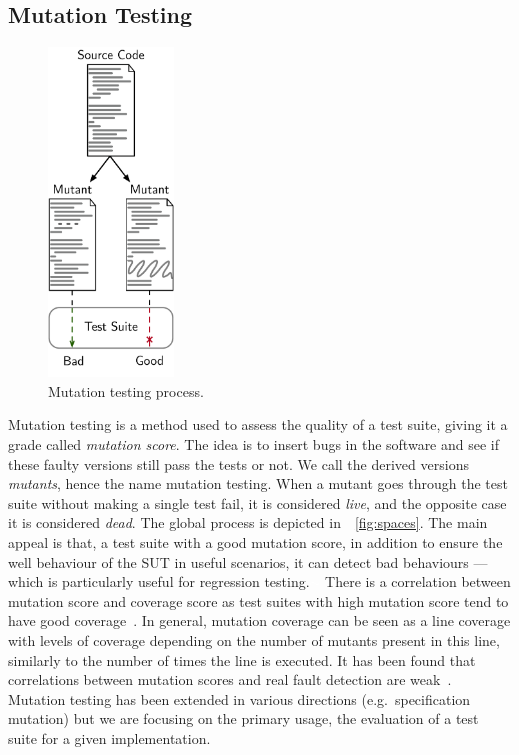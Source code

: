 \documentclass[a4paper,11pt]{sdm_internship}
\newcommand{\rephrase}[1]{\colorbox{BlueViolet!60}{\textcolor{white}{\textbf{$\sim$#1}}}}
\theoremstyle{definition}
\begin{document}
\subsection{Mutation Testing}%
\label{ssec:mutation_testing}
\begin{figure}
  \centering
  \includegraphics[width=9em]{mutation_testing_report}
  \caption{Mutation testing process.}%
\label{fig:mutation_testing}
\end{figure}
Mutation testing is a method used to assess the quality of a test suite, giving it a grade called \textit{mutation score}.
The idea is to insert bugs in the software and see if these faulty versions still pass the tests or not.
We call the derived versions \textit{mutants}, hence the name mutation testing.
When a mutant goes through the test suite without making a single test fail, it is considered \emph{live}, and the opposite case it is considered \emph{dead}.
The global process is depicted in~\figurename~\ref{fig:spaces}.
The main appeal is that, a test suite with a good mutation score, in addition to ensure the well behaviour of the SUT in useful scenarios, it can detect bad behaviours --- which is particularly useful for regression testing.\rephrase{}
There is a correlation between mutation score and coverage score as test suites with high mutation score tend to have good coverage~\cite{assylbekov2013investigating}.
In general, mutation coverage can be seen as a line coverage with levels of coverage depending on the number of mutants present in this line, similarly to the number of times the line is executed.
It has been found that correlations between mutation scores and real fault detection are weak~\cite{papadakis2018mutation,just2014mutants}.
Mutation testing has been extended in various directions (e.g.\ specification mutation) but we are focusing on the primary usage, the evaluation of a test suite for a given implementation.
\end{document}
